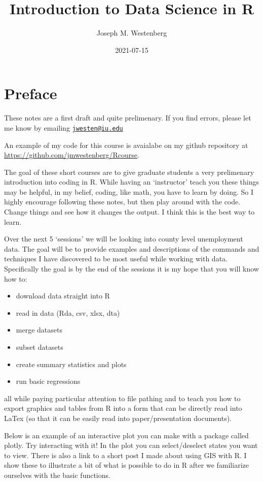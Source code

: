 \documentclass[
]{book}
\title{Introduction to Data Science in R}
\author{Joseph M. Westenberg}
\date{2021-07-15}
\providecommand{\tightlist}{%
  \setlength{\itemsep}{0pt}\setlength{\parskip}{0pt}}
\begin{document}
\maketitle

{
\setcounter{tocdepth}{1}
\tableofcontents
}
\hypertarget{preface}{%
\chapter{Preface}\label{preface}}

These notes are a first draft and quite prelimenary. If you find errors, please let me know by emailing \href{mailto:jwesten@iu.edu}{\nolinkurl{jwesten@iu.edu}}

An example of my code for this course is avaialabe on my github repository at \url{https://github.com/jmwestenberg/Rcourse}.

The goal of these short courses are to give graduate students a very prelimenary introduction into coding in R. While having an `instructor' teach you these things may be helpful, in my belief, coding, like math, you have to learn by doing. So I highly encourage following these notes, but then play around with the code. Change things and see how it changes the output. I think this is the best way to learn.

Over the next 5 `sessions' we will be looking into county level unemployment data. The goal will be to provide examples and descriptions of the commands and techniques I have discovered to be most useful while working with data. Specifically the goal is by the end of the sessions it is my hope that you will know how to:

\begin{itemize}
\tightlist
\item
  download data straight into R
\item
  read in data (Rda, csv, xlsx, dta)
\item
  merge datasets
\item
  subset datasets
\item
  create summary statistics and plots
\item
  run basic regressions
\end{itemize}

all while paying particular attention to file pathing and to teach you how to export graphics and tables from R into a form that can be directly read into LaTex (so that it can be easily read into paper/presentation documents).

Below is an example of an interactive plot you can make with a package called plotly. Try interacting with it! In the plot you can select/deselect states you want to view. There is also a link to a short post I made about using GIS with R. I show these to illustrate a bit of what is possible to do in R after we familiarize ourselves with the basic functions.
\end{document}
